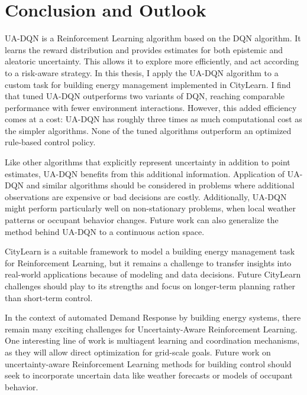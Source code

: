 
\chapter{Conclusion and Outlook}
  \label{conclusion}
UA-DQN is a Reinforcement Learning algorithm based on the DQN algorithm.
It learns the reward distribution and provides estimates for both epistemic and aleatoric uncertainty.
This allows it to explore more efficiently, and act according to a risk-aware strategy.
In this thesis, I apply the UA-DQN algorithm to a custom task for building energy management implemented in CityLearn.
I find that tuned UA-DQN outperforms two variants of DQN, reaching comparable performance with fewer environment interactions.
However, this added efficiency comes at a cost: UA-DQN has roughly three times as much computational cost as the simpler algorithms.
None of the tuned algorithms outperform an optimized rule-based control policy.

Like other algorithms that explicitly represent uncertainty in addition to point estimates, UA-DQN benefits from this additional information.
Application of UA-DQN and similar algorithms should be considered in problems where additional observations are expensive or bad decisions are costly.
Additionally, UA-DQN might perform particularly well on non-stationary problems, when local weather patterns or occupant behavior changes.
Future work can also generalize the method behind UA-DQN to a continuous action space.

CityLearn is a suitable framework to model a building energy management task for Reinforcement Learning, but it remains a challenge to transfer insights into real-world applications because of modeling and data decisions.
Future CityLearn challenges should play to its strengths and focus on longer-term planning rather than short-term control.

In the context of automated Demand Response by building energy systems, there remain many exciting challenges for Uncertainty-Aware Reinforcement Learning.
One interesting line of work is multiagent learning and coordination mechanisms, as they will allow direct optimization for grid-scale goals.
Future work on uncertainty-aware Reinforcement Learning methods for building control should seek to incorporate uncertain data like weather forecasts or models of occupant behavior.